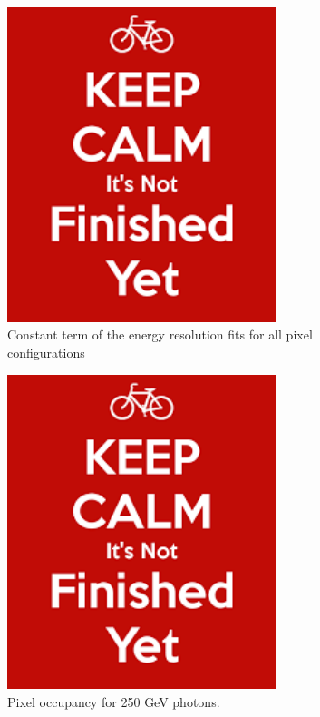 \begin{figure}
  \centering
  \includegraphics[width=0.7\textwidth,keepaspectratio]{DECALStudies/fig/dummy}
  \caption{Constant term of the energy resolution fits for all pixel configurations}
  \label{fig:constantterm}
\end{figure}

\begin{figure}
  \centering
  \includegraphics[width=0.7\textwidth,keepaspectratio]{DECALStudies/fig/dummy}
  \caption{Pixel occupancy for 250 GeV photons.}
  \label{fig:occupancy}
\end{figure}


